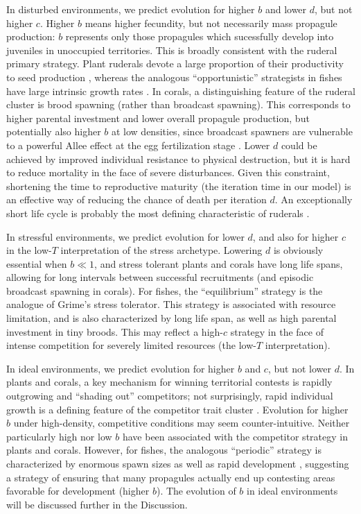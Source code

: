\documentclass[11pt]{article}
\begin{document}
In disturbed environments, we predict evolution for higher $b$ and lower $d$, but not higher $c$. Higher $b$ means higher fecundity, but not necessarily mass propagule production: $b$ represents only those propagules which sucessfully develop into juveniles in unoccupied territories. This is broadly consistent with the ruderal primary strategy. Plant ruderals devote a large proportion of their productivity to seed production \cite{grime_1977}, whereas the analogous ``opportunistic'' strategists in fishes have large intrinsic growth rates \citep{winemiller_1992}. In corals, a distinguishing feature of the ruderal cluster is brood spawning (rather than broadcast spawning). This corresponds to higher parental investment and lower overall propagule production, but potentially also higher $b$ at low densities, since broadcast spawners are vulnerable to a powerful Allee effect at the egg fertilization stage \citep{knowlton_2001}. Lower $d$ could be achieved by improved individual resistance to physical destruction, but it is hard to reduce mortality in the face of severe disturbances. Given this constraint, shortening the time to reproductive maturity (the iteration time in our model) is an effective way of reducing the chance of death per iteration $d$. An exceptionally short life cycle is probably the most defining characteristic of ruderals \citep{grime_1977,winemiller_1992,darling_2012}.

In stressful environments, we predict evolution for lower $d$, and also  for higher $c$ in the low-$T$ interpretation of the stress archetype. Lowering $d$ is obviously essential when $b\ll 1$, and stress tolerant plants and corals have long life spans, allowing for long intervals between successful recruitments (and episodic broadcast spawning in corals). For fishes, the ``equilibrium'' strategy is the analogue of Grime's stress tolerator. This strategy is associated with resource limitation, and is also characterized by long life span, as well as high parental investment in tiny broods. This may reflect a high-$c$ strategy in the face of intense competition for severely limited resources (the low-$T$ interpretation).

In ideal environments, we predict evolution for higher $b$ and $c$, but not lower $d$. In plants and corals, a key mechanism for winning territorial contests is rapidly outgrowing and ``shading out'' competitors; not surprisingly, rapid individual growth is a defining feature of the competitor trait cluster \citep{grime_1977,darling_2012}. Evolution for higher $b$ under high-density, competitive conditions may seem counter-intuitive. Neither particularly high nor low $b$ have been associated with the competitor strategy in plants and corals. However, for fishes, the analogous ``periodic'' strategy is characterized by enormous spawn sizes as well as rapid development \citep{winemiller_1992,winemiller_2015}, suggesting a strategy of ensuring that many propagules actually end up contesting areas favorable for development (higher $b$). The evolution of $b$ in ideal environments will be discussed further in the Discussion.
\end{document}
